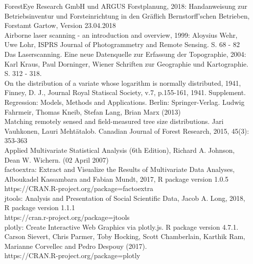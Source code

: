 
\noindent
[1] ForestEye Research GmbH und ARGUS Forstplanung, 2018: Handanweisung zur Betriebsinventur und
Forsteinrichtung in den Gräflich Bernstorff’schen Betrieben, Forstamt Gartow, Version 23.04.2018\\

\noindent
[2] Airborne laser scanning - an introduction and overview, 1999: Aloysius Wehr, Uwe Lohr, ISPRS Journal of
Photogrammetry and Remote Sensing. S. 68 - 82\\

\noindent
[3] Das Laserscanning. Eine neue Datenquelle zur Erfassung der Topographie, 2004: Karl Kraus, Paul
Dorninger, Wiener Schriften zur Geographie und Kartographie. S. 312 - 318.\\

\noindent
[4] On the distribution of a variate whose logarithm is normally distributed, 1941, Finney, D. J., Journal Royal Statiscal Society, v.7, p.155-161, 1941. Supplement.\\

\noindent
[5] Regression: Models, Methods and Applications. Berlin: Springer-Verlag. Ludwig Fahrmeir, Thomas Kneib, Stefan Lang, Brian Marx (2013) \\

\noindent
[6] Matching remotely sensed and field-measured tree size distributions. Jari Vauhkonen, Lauri Mehtätalob. Canadian Journal of Forest Research, 2015, 45(3): 353-363\\

\noindent
[7] Applied Multivariate Statistical Analysis (6th Edition), Richard A. Johnson, Dean W. Wichern. (02 April 2007)\\

\noindent
[8] factoextra: Extract and Visualize the Results of Multivariate Data Analyses, Alboukadel Kassambara and
Fabian Mundt, 2017, R package version 1.0.5 \\
https://CRAN.R-project.org/package=factoextra \\

\noindent
[9] jtools: Analysis and Presentation of Social Scientific Data, Jacob A. Long, 2018, R package version 1.1.1\\
https://cran.r-project.org/package=jtools \\

\noindent
[10] plotly: Create Interactive Web Graphics via plotly.js. R package version 4.7.1. Carson Sievert, Chris Parmer, Toby Hocking, Scott Chamberlain, Karthik Ram, Marianne Corvellec and
Pedro Despouy (2017). \\
https://CRAN.R-project.org/package=plotly \\

